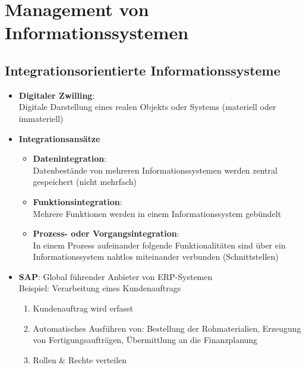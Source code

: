 \documentclass[12pt,a4paper]{article}
\author{Pauline Speckmann}
\begin{document}
\setcounter{section}{2}
\section{Management von Informationssystemen}


\vspace*{1cm}
\subsection{Integrationsorientierte Informationssysteme} %
\begin{itemize}
   \item \textbf{Digitaler Zwilling}:\\
         Digitale Darstellung eines realen Objekts oder Systems (materiell oder immateriell)

   \item \textbf{Integrationsansätze}
      \begin{itemize}
			\item \textbf{Datenintegration}:\\
			      Datenbestände von mehreren Informationssystemen werden zentral gespeichert (nicht mehrfach)
			\item \textbf{Funktionsintegration}:\\
			      Mehrere Funktionen werden in einem Informationssystem gebündelt
			\item \textbf{Prozess- oder Vorgangsintegration}:\\
			      In einem Prozess aufeinander folgende Funktionalitäten sind über ein Informationssystem nahtlos miteinander verbunden (Schnittstellen)
		\end{itemize}

   \item \textbf{SAP}: Global führender Anbieter von ERP-Systemen\\
         Beispiel: Verarbeitung eines Kundenauftrags
      \begin{enumerate}
			\item Kundenauftrag wird erfasst
			\item Automatisches Ausführen von: Bestellung der Rohmaterialien, Erzeugung von Fertigungsaufträgen, Übermittlung an die Finanzplanung
			\item Rollen \& Rechte verteilen
      \end{enumerate}


\end{itemize}
\end{document}

